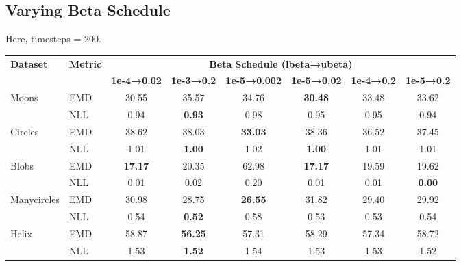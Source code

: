 \documentclass[11pt]{article}
\begin{document}
\subsection{Varying Beta Schedule}
Here, timesteps = 200.

\begin{longtable}{|l|l|c|c|c|c|c|c|}
    \hline
     \textbf{Dataset} & \textbf{Metric} & \multicolumn{6}{c|}{\textbf{Beta Schedule (lbeta→ubeta)}} \\
     \cline{3-8}
     & & \textbf{1e-4→0.02} & \textbf{1e-3→0.2} & \textbf{1e-5→0.002} & \textbf{1e-5→0.02} & \textbf{1e-4→0.2} & \textbf{1e-5→0.2} \\
    \hline
        \multirow{2}{*}{Moons} & EMD & 30.55 & 35.57 & 34.76 & \textbf{30.48} & 33.48 & 33.62 \\
        \cline{2-8}
        & NLL & 0.94 & \textbf{0.93} & 0.98 & 0.95 & 0.95 & 0.94 \\
        \hline
        \multirow{2}{*}{Circles} & EMD & 38.62 & 38.03 & \textbf{33.03} & 38.36 & 36.52 & 37.45 \\
        \cline{2-8}
        & NLL & 1.01 & \textbf{1.00} & 1.02 & \textbf{1.00} & 1.01 & 1.01 \\
        \hline
        \multirow{2}{*}{Blobs} & EMD & \textbf{17.17} & 20.35 & 62.98 & \textbf{17.17} & 19.59 & 19.62 \\
        \cline{2-8}
        & NLL & 0.01 & 0.02 & 0.20 & 0.01 & 0.01 & \textbf{0.00} \\
        \hline
        \multirow{2}{*}{Manycircles} & EMD & 30.98 & 28.75 & \textbf{26.55} & 31.82 & 29.40 & 29.92 \\
        \cline{2-8}
        & NLL & 0.54 & \textbf{0.52} & 0.58 & 0.53 & 0.53 & 0.54 \\
        \hline
        \multirow{2}{*}{Helix} & EMD & 58.87 & \textbf{56.25} & 57.31 & 58.29 & 57.34 & 58.72 \\
        \cline{2-8}
        & NLL & 1.53 & \textbf{1.52} & 1.54 & 1.53 & 1.53 & 1.52 \\
        \hline
    \end{longtable}
\end{document}
